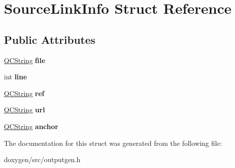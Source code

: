\hypertarget{struct_source_link_info}{}\section{Source\+Link\+Info Struct Reference}
\label{struct_source_link_info}
\subsection*{Public Attributes}
\begin{DoxyCompactItemize}
\item 
\mbox{\label{struct_source_link_info_a17c887dc311b8da42681dc4e9803692d}} 
\mbox{\hyperlink{class_q_c_string}{Q\+C\+String}} {\bfseries file}
\item 
\mbox{\label{struct_source_link_info_abff71a239d4a657ea1543c0426b5726c}} 
int {\bfseries line}
\item 
\mbox{\label{struct_source_link_info_a53631fa171fa05192c059087d66278c0}} 
\mbox{\hyperlink{class_q_c_string}{Q\+C\+String}} {\bfseries ref}
\item 
\mbox{\label{struct_source_link_info_af1fd0f6d7c9418bf922d33d591d7f196}} 
\mbox{\hyperlink{class_q_c_string}{Q\+C\+String}} {\bfseries url}
\item 
\mbox{\label{struct_source_link_info_a3a271e40098bce60ea2d71f452be7fa6}} 
\mbox{\hyperlink{class_q_c_string}{Q\+C\+String}} {\bfseries anchor}
\end{DoxyCompactItemize}


The documentation for this struct was generated from the following file\+:\begin{DoxyCompactItemize}
\item 
doxygen/src/outputgen.\+h\end{DoxyCompactItemize}
